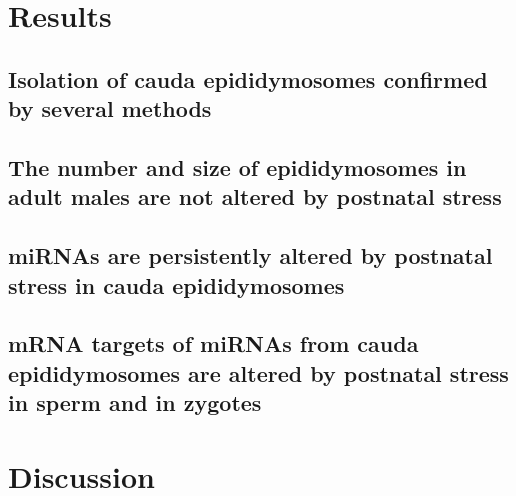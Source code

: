 \documentclass[12pt,twoside]{reedthesis}
\begin{document}
\newpage

\hypertarget{results-1}{%
\section{Results}\label{results-1}}

\hypertarget{isolation-of-cauda-epididymosomes-confirmed-by-several-methods}{%
\subsection{Isolation of cauda epididymosomes confirmed by several methods}\label{isolation-of-cauda-epididymosomes-confirmed-by-several-methods}}

\hypertarget{the-number-and-size-of-epididymosomes-in-adult-males-are-not-altered-by-postnatal-stress}{%
\subsection{The number and size of epididymosomes in adult males are not altered by postnatal stress}\label{the-number-and-size-of-epididymosomes-in-adult-males-are-not-altered-by-postnatal-stress}}

\hypertarget{mirnas-are-persistently-altered-by-postnatal-stress-in-cauda-epididymosomes}{%
\subsection{miRNAs are persistently altered by postnatal stress in cauda epididymosomes}\label{mirnas-are-persistently-altered-by-postnatal-stress-in-cauda-epididymosomes}}

\hypertarget{mrna-targets-of-mirnas-from-cauda-epididymosomes-are-altered-by-postnatal-stress-in-sperm-and-in-zygotes}{%
\subsection{mRNA targets of miRNAs from cauda epididymosomes are altered by postnatal stress in sperm and in zygotes}\label{mrna-targets-of-mirnas-from-cauda-epididymosomes-are-altered-by-postnatal-stress-in-sperm-and-in-zygotes}}

\newpage

\hypertarget{discussion-1}{%
\section{Discussion}\label{discussion-1}}

\newpage
\end{document}

